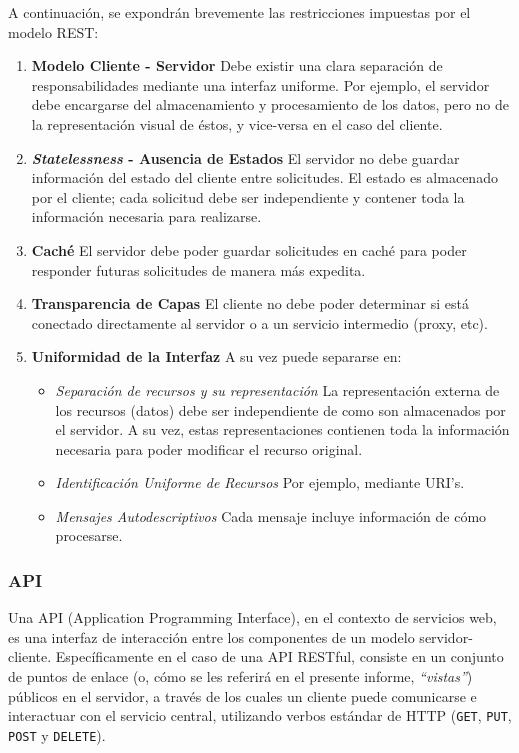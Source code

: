 \documentclass[11pt,letterpaper]{article}
\begin{document}
A continuación, se expondrán brevemente las restricciones impuestas por el modelo REST:
\begin{enumerate}
    \item \textbf{Modelo Cliente - Servidor} \@ Debe existir una clara separación de responsabilidades mediante una interfaz uniforme. Por ejemplo, el servidor debe encargarse del almacenamiento y procesamiento de los datos, pero no de la representación visual de éstos, y vice-versa en el caso del cliente.
    \item \textbf{\textit{Statelessness} - Ausencia de Estados} \@ El servidor no debe guardar información del estado del cliente entre solicitudes. El estado es almacenado por el cliente; cada solicitud debe ser independiente y contener toda la información necesaria para realizarse.
    \item \textbf{Caché} \@ El servidor debe poder guardar solicitudes en caché para poder responder futuras solicitudes de manera más expedita.
    \item \textbf{Transparencia de Capas} \@ El cliente no debe poder determinar si está conectado directamente al servidor o a un servicio intermedio (proxy, etc).
    \item \textbf{Uniformidad de la Interfaz} \@ A su vez puede separarse en:
    \begin{itemize}
        \item \emph{Separación de recursos y su representación} \@ La representación externa de los recursos (datos) debe ser independiente de como son almacenados por el servidor. A su vez, estas representaciones contienen toda la información necesaria para poder modificar el recurso original.
        \item \emph{Identificación Uniforme de Recursos} \@ Por ejemplo, mediante URI's\cite{uri}.
        \item \emph{Mensajes Autodescriptivos} \@ Cada mensaje incluye información de cómo procesarse.
    \end{itemize}
\end{enumerate}

\subsubsection{API}

Una API (Application Programming Interface), en el contexto de servicios web, es una interfaz de interacción entre los componentes de un modelo servidor-cliente. Específicamente en el caso de una API RESTful, consiste en un conjunto de puntos de enlace (o, cómo se les referirá en el presente informe, \emph{``vistas''}) públicos en el servidor, a través de los cuales un cliente puede comunicarse e interactuar con el servicio central, utilizando verbos estándar de HTTP (\texttt{GET}, \texttt{PUT}, \texttt{POST} y \texttt{DELETE}).
\end{document}
